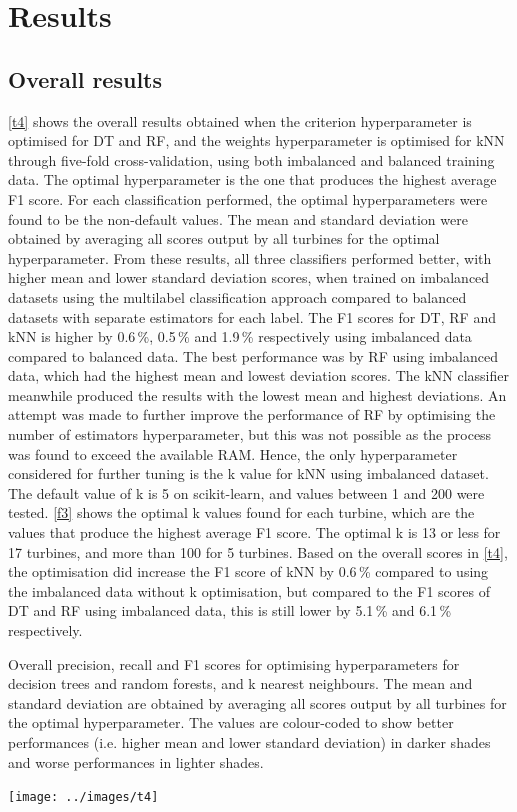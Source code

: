 \chapter{Results}\label{c3}

\section{Overall results}

\autoref{t4} shows the overall results obtained when the criterion hyperparameter is optimised for DT and RF, and the weights hyperparameter is optimised for kNN through five-fold cross-validation, using both imbalanced and balanced training data. The optimal hyperparameter is the one that produces the highest average F1 score. For each classification performed, the optimal hyperparameters were found to be the non-default values. The mean and standard deviation were obtained by averaging all scores output by all turbines for the optimal hyperparameter. From these results, all three classifiers performed better, with higher mean and lower standard deviation scores, when trained on imbalanced datasets using the multilabel classification approach compared to balanced datasets with separate estimators for each label. The F1 scores for DT, RF and kNN is higher by 0.6\,\%, 0.5\,\% and 1.9\,\% respectively using imbalanced data compared to balanced data. The best performance was by RF using imbalanced data, which had the highest mean and lowest deviation scores. The kNN classifier meanwhile produced the results with the lowest mean and highest deviations. An attempt was made to further improve the performance of RF by optimising the number of estimators hyperparameter, but this was not possible as the process was found to exceed the available RAM. Hence, the only hyperparameter considered for further tuning is the k value for kNN using imbalanced dataset. The default value of k is 5 on scikit-learn, and values between 1 and 200 were tested. \autoref{f3} shows the optimal k values found for each turbine, which are the values that produce the highest average F1 score. The optimal k is 13 or less for 17 turbines, and more than 100 for 5 turbines. Based on the overall scores in \autoref{t4}, the optimisation did increase the F1 score of kNN by 0.6\,\% compared to using the imbalanced data without k optimisation, but compared to the F1 scores of DT and RF using imbalanced data, this is still lower by 5.1\,\% and 6.1\,\% respectively.

\begin{table}
  \centering
  \caption{\label{t4}Overall precision, recall and F1 scores for optimising hyperparameters for decision trees and random forests, and k nearest neighbours. The mean and standard deviation are obtained by averaging all scores output by all turbines for the optimal hyperparameter. The values are colour-coded to show better performances (i.e. higher mean and lower standard deviation) in darker shades and worse performances in lighter shades.}
  \texttt{[image: ../images/t4]}
\end{table}

